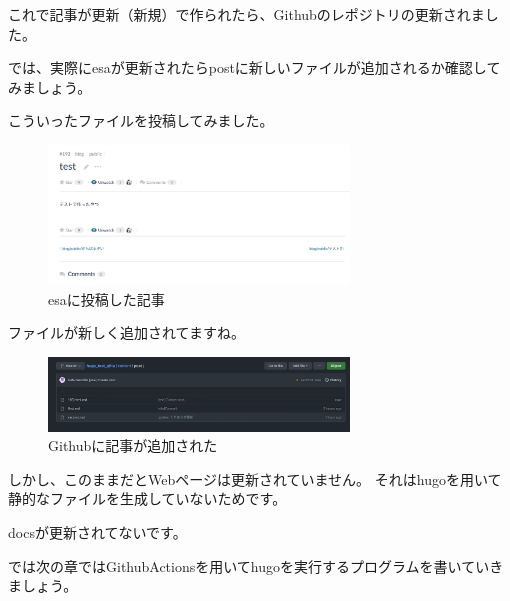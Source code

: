   これで記事が更新（新規）で作られたら、Githubのレポジトリの更新されました。

  では、実際にesaが更新されたらpostに新しいファイルが追加されるか確認してみましょう。

  こういったファイルを投稿してみました。

  \begin{figure}[H]
    \centering
    \includegraphics[width=8cm]{./image/02-chap7/esa-posted.png}
    \caption{esaに投稿した記事 }
    \label{chap7-esa-posted-image}
  \end{figure}

  ファイルが新しく追加されてますね。

  \begin{figure}[H]
    \centering
    \includegraphics[width=8cm]{./image/02-chap7/github-upload-image.png}
    \caption{Githubに記事が追加された }
    \label{chap7-github-upload-image-image}
  \end{figure}

  しかし、このままだとWebページは更新されていません。
  それはhugoを用いて静的なファイルを生成していないためです。

  docsが更新されてないです。

  では次の章ではGithubActionsを用いてhugoを実行するプログラムを書いていきましょう。

  


  
  
  